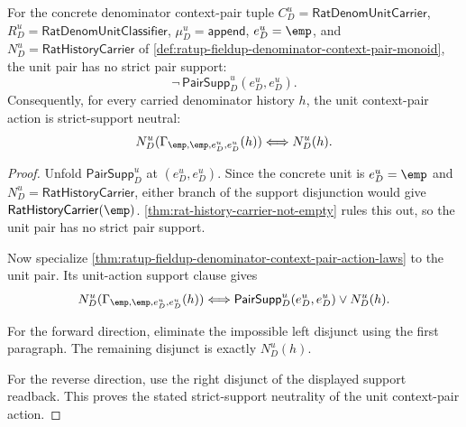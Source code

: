 \begin{theorem}
\label{thm:ratup-fieldup-denominator-context-pair-unit-support-neutrality}
For the concrete denominator context-pair tuple
$C_D^u=\mathsf{RatDenomUnitCarrier}$,
$R_D^u=\mathsf{RatDenomUnitClassifier}$, $\mu_D^u=\mathsf{append}$,
$e_D^u=\emp$, and $N_D^u=\mathsf{RatHistoryCarrier}$ of
\autoref{def:ratup-fieldup-denominator-context-pair-monoid}, the unit pair has
no strict pair support:
$$
\neg\,\mathsf{PairSupp}_D^u(e_D^u,e_D^u).
$$
Consequently, for every carried denominator history $h$, the unit context-pair
action is strict-support neutral:
$$
N_D^u(\Gamma_{\emp,\emp,e_D^u,e_D^u}(h))
\Longleftrightarrow N_D^u(h).
$$
\end{theorem}
\begin{proof}
Unfold $\mathsf{PairSupp}_D^u$ at $(e_D^u,e_D^u)$. Since the concrete unit is
$e_D^u=\emp$ and $N_D^u=\mathsf{RatHistoryCarrier}$, either branch of the
support disjunction would give $\mathsf{RatHistoryCarrier}(\emp)$.
\autoref{thm:rat-history-carrier-not-empty} rules this out, so the unit pair
has no strict pair support.

Now specialize
\autoref{thm:ratup-fieldup-denominator-context-pair-action-laws} to the unit
pair. Its unit-action support clause gives
$$
N_D^u(\Gamma_{\emp,\emp,e_D^u,e_D^u}(h))
\Longleftrightarrow
\mathsf{PairSupp}_D^u(e_D^u,e_D^u)\lor N_D^u(h).
$$

For the forward direction, eliminate the impossible left disjunct using the
first paragraph. The remaining disjunct is exactly $N_D^u(h)$.

For the reverse direction, use the right disjunct of the displayed support
readback. This proves the stated strict-support neutrality of the unit
context-pair action.
\end{proof}

